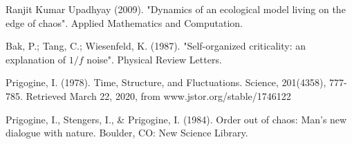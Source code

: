 \documentclass{article}
\begin{document}
\begin{thebibliography}{9}

Ranjit Kumar Upadhyay (2009). "Dynamics of an ecological model living on the edge of chaos". Applied Mathematics and Computation.

Bak, P.; Tang, C.; Wiesenfeld, K. (1987). "Self-organized criticality: an explanation of $1/f$ noise". Physical Review Letters.

Prigogine, I. (1978). Time, Structure, and Fluctuations. Science, 201(4358), 777-785. Retrieved March 22, 2020, from www.jstor.org/stable/1746122

Prigogine, I., Stengers, I., & Prigogine, I. (1984). Order out of chaos: Man's new dialogue with nature. Boulder, CO: New Science Library.








\end{thebibliography}
\end{document}
